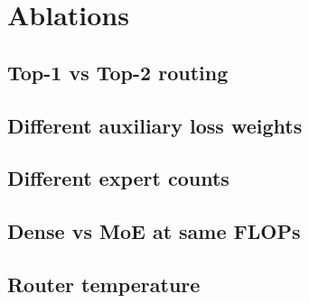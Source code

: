 \section{Ablations}

\subsection{Top-1 vs Top-2 routing}
\subsection{Different auxiliary loss weights}
\subsection{Different expert counts}
\subsection{Dense vs MoE at same FLOPs}
\subsection{Router temperature}